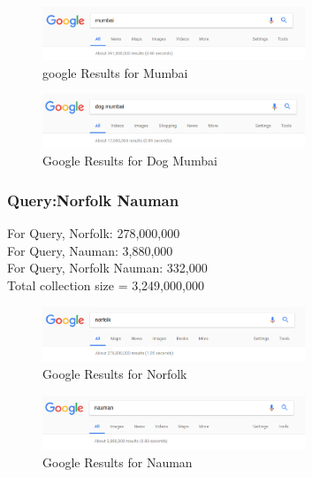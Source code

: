 \documentclass[12pt]{report}
\begin{document}
\begin{figure}[ht] 
  \centering
  \includegraphics[width=0.7\textwidth]{Google_mumbai.png}
  \caption{google Results for Mumbai}
  \label{fig:8}
\end{figure}

\begin{figure}[ht] 
  \centering
  \includegraphics[width=0.7\textwidth]{Google_dogmumbai.png}
  \caption{Google Results for Dog Mumbai}
  \label{fig:9}
\end{figure}

\subsubsection{Query:Norfolk Nauman}
For Query, Norfolk: 278,000,000\\
For Query, Nauman: 3,880,000\\
For Query, Norfolk Nauman: 332,000\\

Total collection size = 3,249,000,000\\

\begin{figure}[ht] 
  \centering
  \includegraphics[width=0.7\textwidth]{Google_norfolk.png}
  \caption{Google Results for Norfolk}
  \label{fig:10}
\end{figure}

\begin{figure}[ht] 
  \centering
  \includegraphics[width=0.7\textwidth]{Google_nauman.png}
  \caption{Google Results for Nauman}
  \label{fig:11}
\end{figure}
\end{document}
